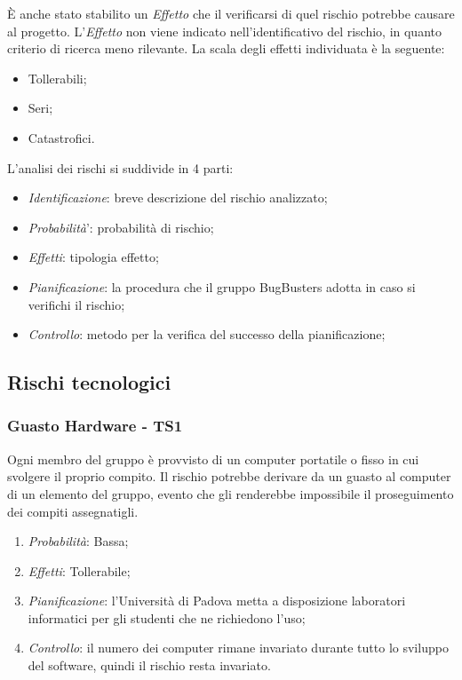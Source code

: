 \`E anche stato stabilito un \textit{Effetto} che il verificarsi di quel rischio potrebbe causare al progetto. L'\textit{Effetto} non viene indicato nell'identificativo del rischio, in quanto criterio di ricerca meno rilevante. La scala degli effetti individuata è la seguente:
\begin{itemize}
\item Tollerabili;
\item Seri;
\item Catastrofici.
\end{itemize}

L'analisi dei rischi si suddivide in 4 parti:
\begin{itemize}
\item \textit{Identificazione}: breve descrizione del rischio analizzato;
\item \textit{Probabilit\`a}': probabilit\`a di rischio;
\item \textit{Effetti}: tipologia effetto;
\item \textit{Pianificazione}: la procedura che il gruppo BugBusters adotta in caso si verifichi il rischio;
\item \textit{Controllo}: metodo per la verifica del successo della pianificazione;
\end{itemize}

\subsection{Rischi tecnologici}
\subsubsection{Guasto Hardware - TS1}
Ogni membro del gruppo \`e provvisto di un computer portatile o fisso in cui svolgere il proprio compito. Il rischio potrebbe derivare da un guasto al computer di un elemento del gruppo, evento che gli renderebbe impossibile il proseguimento dei compiti assegnatigli.
\begin{enumerate}
\item \textit{Probabilit\`a}: Bassa;
\item \textit{Effetti}: Tollerabile; 
\item \textit{Pianificazione}: l'Universit\`a di Padova metta a disposizione laboratori informatici per gli studenti che ne richiedono l'uso;
\item \textit{Controllo}: il numero dei computer rimane invariato durante tutto lo sviluppo del software, quindi il rischio resta invariato.
\end{enumerate}

